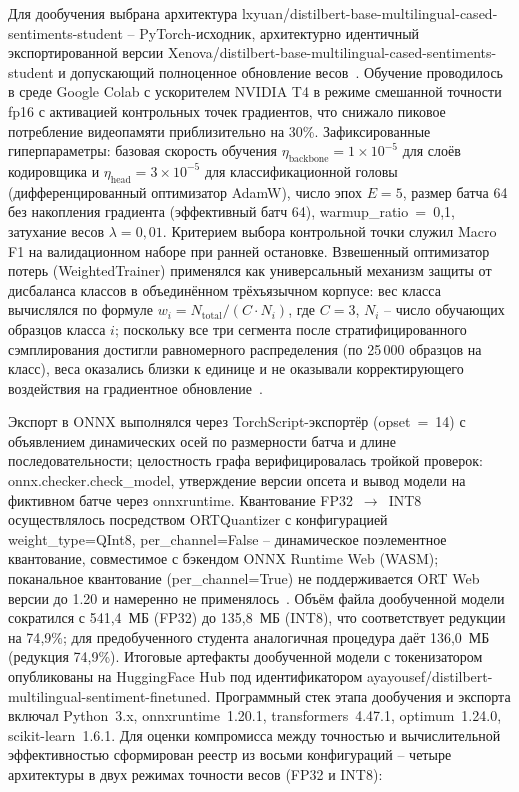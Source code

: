 Для дообучения выбрана архитектура lxyuan/distilbert-base-multilingual-cased-sentiments-student – PyTorch-исходник, архитектурно идентичный экспортированной версии Xenova/distilbert-base-multilingual-cased-sentiments-student и допускающий полноценное обновление весов~\cite{sanh2019distilbert}. Обучение проводилось в среде Google Colab с ускорителем NVIDIA T4 в режиме смешанной точности fp16 с активацией контрольных точек градиентов, что снижало пиковое потребление видеопамяти приблизительно на 30\%. Зафиксированные гиперпараметры: базовая скорость обучения $\eta_\text{backbone} = 1 \times 10^{-5}$ для слоёв кодировщика и $\eta_\text{head} = 3 \times 10^{-5}$ для классификационной головы (дифференцированный оптимизатор AdamW), число эпох $E = 5$, размер батча 64 без накопления градиента (эффективный батч 64), warmup\_ratio~=~0{,}1, затухание весов $\lambda = 0{,}01$. Критерием выбора контрольной точки служил Macro F1 на валидационном наборе при ранней остановке. Взвешенный оптимизатор потерь (WeightedTrainer) применялся как универсальный механизм защиты от дисбаланса классов в объединённом трёхъязычном корпусе: вес класса вычислялся по формуле $w_i = N_\text{total} / (C \cdot N_i)$, где $C = 3$, $N_i$ – число обучающих образцов класса $i$; поскольку все три сегмента после стратифицированного сэмплирования достигли равномерного распределения (по 25\,000 образцов на класс), веса оказались близки к единице и не оказывали корректирующего воздействия на градиентное обновление~\cite{wolf2020transformers}.

Экспорт в ONNX выполнялся через TorchScript-экспортёр (opset~=~14) с объявлением динамических осей по размерности батча и длине последовательности; целостность графа верифицировалась тройкой проверок: onnx.checker.check\_model, утверждение версии опсета и вывод модели на фиктивном батче через onnxruntime. Квантование FP32~$\rightarrow$~INT8 осуществлялось посредством ORTQuantizer с конфигурацией weight\_type=QInt8, per\_channel=False – динамическое поэлементное квантование, совместимое с бэкендом ONNX Runtime Web (WASM); поканальное квантование (per\_channel=True) не поддерживается ORT Web версии до 1.20 и намеренно не применялось~\cite{dettmers2022llmint8, gholami2021quantization}. Объём файла дообученной модели сократился с 541{,}4~МБ (FP32) до 135{,}8~МБ (INT8), что соответствует редукции на 74{,}9\%; для предобученного студента аналогичная процедура даёт 136{,}0~МБ (редукция 74{,}9\%). Итоговые артефакты дообученной модели с токенизатором опубликованы на HuggingFace Hub под идентификатором ayayousef/distilbert-multilingual-sentiment-finetuned. Программный стек этапа дообучения и экспорта включал Python~3.x, onnxruntime~1.20.1, transformers~4.47.1, optimum~1.24.0, scikit-learn~1.6.1. Для оценки компромисса между точностью и вычислительной эффективностью сформирован реестр из восьми конфигураций – четыре архитектуры в двух режимах точности весов (FP32 и INT8):

